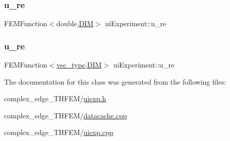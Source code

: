 \mbox{\label{classui_experiment_aac4bf7e51a978a58d1dab5f0dcb62b54}} 
\subsubsection{\texorpdfstring{u\+\_\+re}{u\_re}\hspace{0.1cm}{\footnotesize\ttfamily [1/2]}}
{\footnotesize\ttfamily F\+E\+M\+Function$<$double,\mbox{\hyperlink{complex__node___t_h_f_e_m_2uiexp_8h_a589b8b9bfdf714f736059845d568b597}{D\+IM}}$>$ ui\+Experiment\+::u\+\_\+re\hspace{0.3cm}{\ttfamily [private]}}

\mbox{\label{classui_experiment_aabad5b9464e03403d9c443b5130325f9}} 
\subsubsection{\texorpdfstring{u\+\_\+re}{u\_re}\hspace{0.1cm}{\footnotesize\ttfamily [2/2]}}
{\footnotesize\ttfamily F\+E\+M\+Function$<$\mbox{\hyperlink{complex__edge___t_h_f_e_m_2emdefs_8h_a0a0de407de54661e0d56aa8686c104d9}{vec\+\_\+type}},\mbox{\hyperlink{complex__node___t_h_f_e_m_2uiexp_8h_a589b8b9bfdf714f736059845d568b597}{D\+IM}}$>$ ui\+Experiment\+::u\+\_\+re\hspace{0.3cm}{\ttfamily [private]}}



The documentation for this class was generated from the following files\+:\begin{DoxyCompactItemize}
\item 
complex\+\_\+edge\+\_\+\+T\+H\+F\+E\+M/\mbox{\hyperlink{complex__edge___t_h_f_e_m_2uiexp_8h}{uiexp.\+h}}\item 
complex\+\_\+edge\+\_\+\+T\+H\+F\+E\+M/\mbox{\hyperlink{complex__edge___t_h_f_e_m_2datacache_8cpp}{datacache.\+cpp}}\item 
complex\+\_\+edge\+\_\+\+T\+H\+F\+E\+M/\mbox{\hyperlink{complex__edge___t_h_f_e_m_2uiexp_8cpp}{uiexp.\+cpp}}\end{DoxyCompactItemize}
